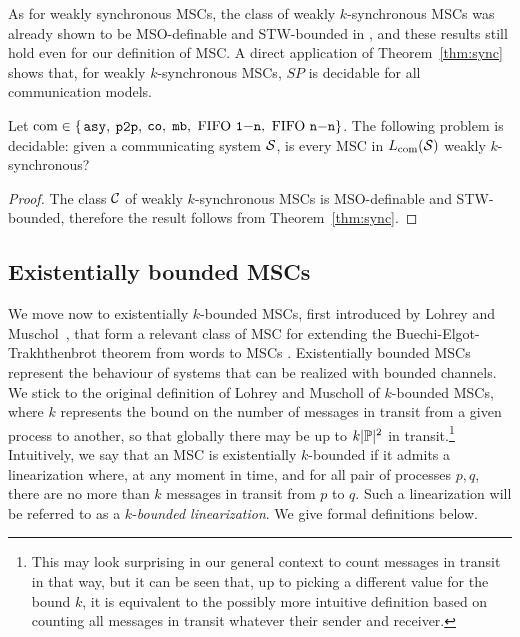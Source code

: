 As for weakly synchronous MSCs, the class of weakly $k$-synchronous MSCs was already shown to be MSO-definable and STW-bounded in \cite{BolligGFLLS21}, and these results still hold even for our definition of MSC. A direct application of Theorem~\ref{thm:sync} shows that, for weakly $k$-synchronous MSCs, $SP$ is decidable for all communication models.

\begin{proposition}\label{thm:weak-k-sync}
	Let $\textup{com} \in \{$$\mathtt{asy}, $ $\mathtt{p2p}, $ $\mathtt{co}, $ $\mathtt{mb}, $ $\text{FIFO } \mathtt{1\mathsf{-}n}, $ $\text{FIFO } \mathtt{n\mathsf{-}n}\}$.
	The following problem is decidable:
	given a communicating system $\mathcal{S}$,
	is every MSC in $L_{\textup{com}}(\mathcal{S})$ weakly $k$-synchronous?
\end{proposition}
\begin{proof}
	The class $\mathcal{C}$ of weakly $k$-synchronous MSCs is MSO-definable and STW-bounded, therefore the
	result follows from Theorem~\ref{thm:sync}.
\end{proof}

\subsection{Existentially bounded MSCs}

We move now to existentially $k$-bounded MSCs, first introduced by Lohrey and Muschol~\cite{DBLP:conf/fossacs/LohreyM02}, that form a relevant class of MSC for extending the
Buechi-Elgot-Trakhthenbrot theorem from words to MSCs \cite{DBLP:conf/dlt/GenestMK04,GKM07}. 
Existentially bounded MSCs represent the behaviour of systems that can be realized with bounded channels. 
We stick to the original definition of Lohrey and Muscholl of $k$-bounded MSCs, where $k$
represents the bound on the number of messages in transit from a given process to another, so that globally
there may be up to $k| \mathbb{P} |^2$ in transit.\footnote{This may look
surprising in our general context to count messages in transit in that way, but it can be seen that, up to picking
a different value for the bound $k$, it is equivalent to the possibly more
intuitive definition based on counting all messages in transit whatever their sender and receiver.}
Intuitively, we say that an MSC is existentially $k$-bounded if it admits a linearization where, at any moment in time, and for all pair of processes $p,q$, there are no more than $k$ messages in transit from $p$ to $q$. Such a linearization will be referred to as a $k$-\emph{bounded linearization}. We give formal definitions below.

